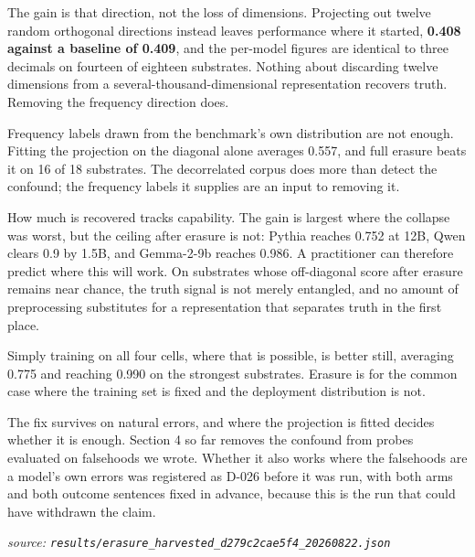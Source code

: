 \documentclass[10pt]{article}
\begin{document}
The gain is that direction, not the loss of dimensions. Projecting out twelve random orthogonal directions instead leaves performance where it started, \textbf{0.408 against a baseline of 0.409}, and the per-model figures are identical to three decimals on fourteen of eighteen substrates. Nothing about discarding twelve dimensions from a several-thousand-dimensional representation recovers truth. Removing the frequency direction does.

Frequency labels drawn from the benchmark's own distribution are not enough. Fitting the projection on the diagonal alone averages 0.557, and full erasure beats it on 16 of 18 substrates. The decorrelated corpus does more than detect the confound; the frequency labels it supplies are an input to removing it.

How much is recovered tracks capability. The gain is largest where the collapse was worst, but the ceiling after erasure is not: Pythia reaches 0.752 at 12B, Qwen clears 0.9 by 1.5B, and Gemma-2-9b reaches 0.986. A practitioner can therefore predict where this will work. On substrates whose off-diagonal score after erasure remains near chance, the truth signal is not merely entangled, and no amount of preprocessing substitutes for a representation that separates truth in the first place.

Simply training on all four cells, where that is possible, is better still, averaging 0.775 and reaching 0.990 on the strongest substrates. Erasure is for the common case where the training set is fixed and the deployment distribution is not.

The fix survives on natural errors, and where the projection is fitted decides whether it is enough. Section 4 so far removes the confound from probes evaluated on falsehoods we wrote. Whether it also works where the falsehoods are a model's own errors was registered as D-026 before it was run, with both arms and both outcome sentences fixed in advance, because this is the run that could have withdrawn the claim.

{\footnotesize\raggedright\sloppy \emph{source: \texttt{results/erasure\_harvested\_d279c2cae5f4\_20260822.json}}\par}
\end{document}
